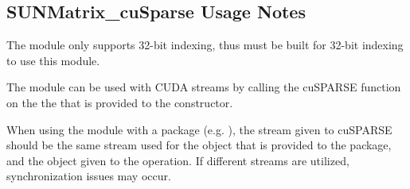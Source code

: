 \subsection{SUNMatrix\_cuSparse Usage Notes}
\label{ss:sunmat_cusparse_notes}

The  module only supports 32-bit indexing,
thus {\sundials} must be built for 32-bit indexing to use this module.

The  module can be used with CUDA streams by
calling the cuSPARSE function  on the the
 that is provided to the 
constructor.

{\warn} When using the  module with a {\sundials}
package (e.g. {\cvode}), the stream given to cuSPARSE should be the same
stream used for the {\nvector} object that is provided to the package,
and the {\nvector} object given to the  operation. If different
streams are utilized, synchronization issues may occur.
